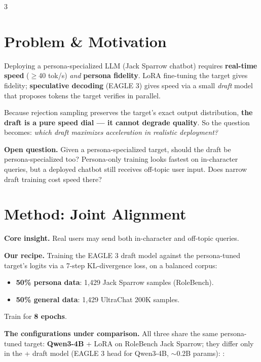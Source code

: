 \documentclass[9pt]{extarticle}
\begin{document}
\begin{multicols}{3}

\section{Problem \& Motivation}

Deploying a persona-specialized LLM (Jack Sparrow chatbot) requires \textbf{real-time speed} ($\geq$40 tok/s) \emph{and} \textbf{persona fidelity}. LoRA fine-tuning the target gives fidelity; \textbf{speculative decoding} (EAGLE 3) gives speed via a small \emph{draft} model that proposes tokens the target verifies in parallel.

Because rejection sampling preserves the target's exact output distribution, \textbf{the draft is a pure speed dial --- it cannot degrade quality}. So the question becomes: \emph{which draft maximizes acceleration in realistic deployment?}

\textbf{Open question.} Given a persona-specialized target, should the draft be persona-specialized too? Persona-only training looks fastest on in-character queries, but a deployed chatbot still receives off-topic user input. Does narrow draft training cost speed there?

\section{Method: Joint Alignment}

\begin{heroboxnote}
\textbf{Core insight.} Real users may send both in-character and off-topic queries.
\end{heroboxnote}

\textbf{Our recipe.} Training the EAGLE 3 draft model against the persona-tuned target's logits via a 7-step KL-divergence loss, on a balanced corpus:
\begin{itemize}
  \item \textbf{50\% persona data}: 1{,}429 Jack Sparrow samples (RoleBench).
  \item \textbf{50\% general data}: 1{,}429 UltraChat 200K samples.
\end{itemize}
Train for \textbf{8 epochs}.

\textbf{The configurations under comparison.} All three share the same persona-tuned target: \textbf{Qwen3-4B} + LoRA on RoleBench Jack Sparrow; they differ only in the + draft model (EAGLE 3 head for Qwen3-4B, $\sim$0.2B params): :


\end{multicols}
\end{document}
